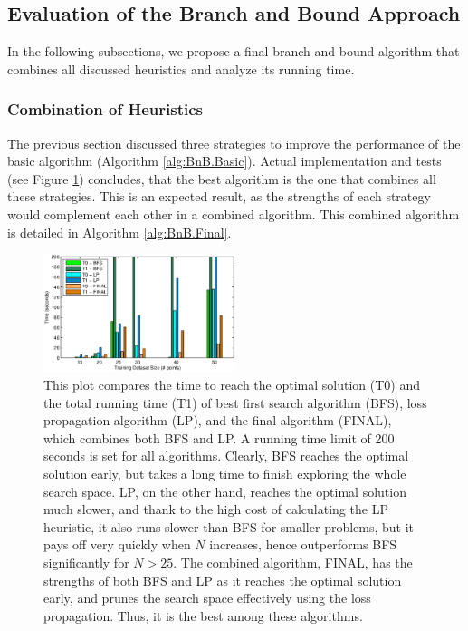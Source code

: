 \subsection{Evaluation of the Branch and Bound Approach}
\label{sec:bnb.final}

In the following subsections, we propose a final branch and bound
algorithm that combines all discussed heuristics and analyze its
running time.

\subsubsection{Combination of Heuristics}

The previous section discussed three strategies to improve the
performance of the basic algorithm (Algorithm
\ref{alg:BnB.Basic}). Actual implementation and tests (see Figure
\ref{fig:BnBtimes}) concludes, that the best algorithm is the one that
combines all these strategies. This is an expected result, as the
strengths of each strategy would complement each other in a combined
algorithm. This combined algorithm is detailed in Algorithm
\ref{alg:BnB.Final}.

\begin{figure}[here]
\includegraphics[width=0.50\textwidth]{images/fig33_BnBtimes.eps}
\caption{ This plot compares the time to reach the optimal solution
  (T0) and the total running time (T1) of best first search algorithm
  (BFS), loss propagation algorithm (LP), and the final algorithm
  (FINAL), which combines both BFS and LP. A running time limit of 200
  seconds is set for all algorithms. Clearly, BFS reaches the optimal
  solution early, but takes a long time to finish exploring the whole
  search space. LP, on the other hand, reaches the optimal solution
  much slower, and thank to the high cost of calculating the LP
  heuristic, it also runs slower than BFS for smaller problems, but it
  pays off very quickly when $N$ increases, hence outperforms BFS
  significantly for $N>25$. The combined algorithm, FINAL, has the
  strengths of both BFS and LP as it reaches the optimal solution
  early, and prunes the search space effectively using the loss
  propagation. Thus, it is the best among these algorithms.}
\label{fig:BnBtimes}
\end{figure} 

